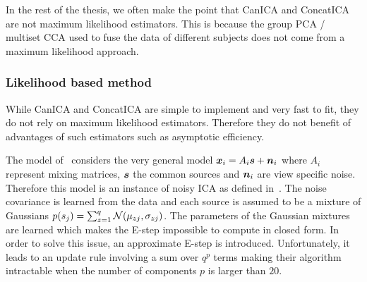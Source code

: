   In the rest of the thesis, we often make the point that CanICA and ConcatICA
  are not maximum likelihood estimators. This is because the group PCA /
  multiset CCA  used to fuse the data of different subjects does not come from a
  maximum likelihood approach.
% 

\subsubsection{Likelihood based method}
\label{sec:guo}
While CanICA and ConcatICA are simple to implement and very fast to fit, they do
not rely on maximum likelihood estimators. Therefore they do not benefit of
advantages of such estimators such as asymptotic efficiency.

The model of~\cite{guo2008unified} considers the very general model $\boldsymbol{x}_i =
A_i\boldsymbol{s} + \boldsymbol{n}_i$ where
$A_i$ represent mixing matrices, $\boldsymbol{s}$ the common sources and $\boldsymbol{n}_i$ are view
specific noise. Therefore this model is an instance of noisy ICA as defined
in~\cite{hyvarinen1999Gaussian}. The noise covariance is learned from the data
and each source is assumed to be a mixture of Gaussians
$p(s_j) = \sum_{z=1}^q \mathcal{N}(\mu_{zj}, \sigma_{zj})$. The parameters of the
Gaussian mixtures are learned which makes the E-step impossible to compute in closed form.
In order to solve this issue, an approximate E-step is introduced.
Unfortunately, it leads to an update rule involving a sum over $q^p$ terms making their algorithm intractable when the number of components $p$ is larger than $20$. 

